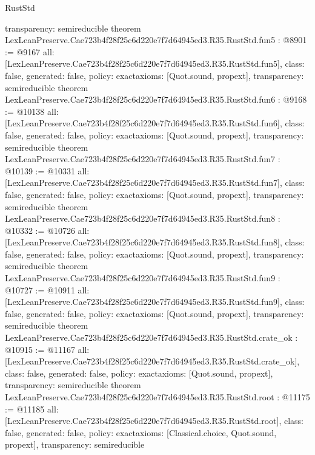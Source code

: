 \begin{lexlean}{RustStd}
\begin{coremodule}
{  transparency: semireducible
}
theorem LexLeanPreserve.Cae723b4f28f25c6d220e7f7d64945ed3.R35.RustStd.fun5 : @8901 := @9167 {
  all: [LexLeanPreserve.Cae723b4f28f25c6d220e7f7d64945ed3.R35.RustStd.fun5],
  class: false,
  generated: false,
  policy: exact{axioms: [Quot.sound, propext]},
  transparency: semireducible
}
theorem LexLeanPreserve.Cae723b4f28f25c6d220e7f7d64945ed3.R35.RustStd.fun6 : @9168 := @10138 {
  all: [LexLeanPreserve.Cae723b4f28f25c6d220e7f7d64945ed3.R35.RustStd.fun6],
  class: false,
  generated: false,
  policy: exact{axioms: [Quot.sound, propext]},
  transparency: semireducible
}
theorem LexLeanPreserve.Cae723b4f28f25c6d220e7f7d64945ed3.R35.RustStd.fun7 : @10139 := @10331 {
  all: [LexLeanPreserve.Cae723b4f28f25c6d220e7f7d64945ed3.R35.RustStd.fun7],
  class: false,
  generated: false,
  policy: exact{axioms: [Quot.sound, propext]},
  transparency: semireducible
}
theorem LexLeanPreserve.Cae723b4f28f25c6d220e7f7d64945ed3.R35.RustStd.fun8 : @10332 := @10726 {
  all: [LexLeanPreserve.Cae723b4f28f25c6d220e7f7d64945ed3.R35.RustStd.fun8],
  class: false,
  generated: false,
  policy: exact{axioms: [Quot.sound, propext]},
  transparency: semireducible
}
theorem LexLeanPreserve.Cae723b4f28f25c6d220e7f7d64945ed3.R35.RustStd.fun9 : @10727 := @10911 {
  all: [LexLeanPreserve.Cae723b4f28f25c6d220e7f7d64945ed3.R35.RustStd.fun9],
  class: false,
  generated: false,
  policy: exact{axioms: [Quot.sound, propext]},
  transparency: semireducible
}
theorem LexLeanPreserve.Cae723b4f28f25c6d220e7f7d64945ed3.R35.RustStd.crate_ok : @10915 := @11167 {
  all: [LexLeanPreserve.Cae723b4f28f25c6d220e7f7d64945ed3.R35.RustStd.crate_ok],
  class: false,
  generated: false,
  policy: exact{axioms: [Quot.sound, propext]},
  transparency: semireducible
}
theorem LexLeanPreserve.Cae723b4f28f25c6d220e7f7d64945ed3.R35.RustStd.root : @11175 := @11185 {
  all: [LexLeanPreserve.Cae723b4f28f25c6d220e7f7d64945ed3.R35.RustStd.root],
  class: false,
  generated: false,
  policy: exact{axioms: [Classical.choice, Quot.sound, propext]},
  transparency: semireducible
}


\end{coremodule}
\end{lexlean}
